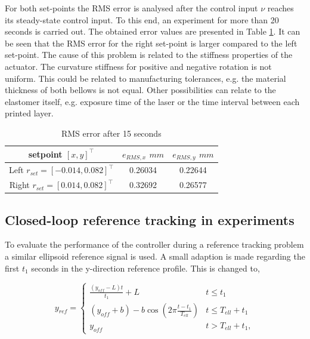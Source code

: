 For both set-points the RMS error is analysed after the control input $\nu$ reaches its steady-state control input. To this end, an experiment for more than 20 seconds is carried out. The obtained error values are presented in Table \ref{tab:RMSerrors}. It can be seen that the RMS error for the right set-point is larger compared to the left set-point. The cause of this problem is related to the stiffness properties of the actuator. The curvature stiffness for positive and negative rotation is not uniform. This could be related to manufacturing tolerances, e.g. the material thickness of both bellows is not equal. Other possibilities can relate to the elastomer itself, e.g. exposure time of the laser or the time interval between each printed layer. 



\begin{table}[H]
    \centering
    \caption{RMS error after 15 seconds}
    \begin{tabular}{|c|c|c|} \hline
     setpoint $[x,y]^\top$    & $e_{RMS,x}$ $mm$  &  $e_{RMS,y}$ $mm$  \\ \hline
    Left $r_{set}= [-0.014,0.082]^\top$     & 0.26034  & 0.22644 \\ \hline
    Right $r_{set}= [0.014,0.082]^\top$  &  0.32692&   0.26577\\ \hline
    \end{tabular}
    \label{tab:RMSerrors}
\end{table}



\subsection*{Closed-loop reference tracking in experiments}

To evaluate the performance of the controller during a reference tracking problem a similar ellipsoid reference signal is used. A small adaption is made regarding the first $t_1$ seconds in the y-direction reference profile. This is changed to,


\begin{equation}
    y_{ref} = \begin{cases} 
      \frac{(y_{off} - L) t}{t_1} + L&  t \leq t_1 \\
     (y_{off} +b) -  b \cos(2\pi \frac{t - t_1}{T_{ell}}) & t \leq T_{ell} + t_1 \\
     y_{off} & t > T_{ell} + t_1,
   \end{cases} 
\end{equation}

